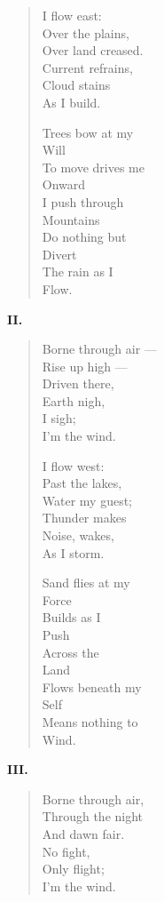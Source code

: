 \begin{paracol}{2}
\begin{leftcolumn}
\begin{verse}
  I flow east:\\
\vin   Over the plains,\\
  Over land creased.\\
\vin   Current refrains,\\
\vin   Cloud stains\\
  As I build.

  Trees bow at my\\
\vin \vin Will\\
  To move drives me\\
\vin \vin Onward\\
  I push through\\
\vin \vin Mountains\\
  Do nothing but\\
\vin \vin Divert\\
  The rain as I\\
\vin \vin Flow.\\
\end{verse}
\newpage

\textbf{II.}
\begin{verse}
  Borne through air ---\\
  \vin Rise up high ---\\
  Driven there,\\
  \vin Earth nigh,\\
  \vin I sigh;\\
  I'm the wind.

  I flow west:\\
  \vin Past the lakes,\\
  Water my guest;\\
  \vin Thunder makes\\
  \vin Noise, wakes,\\
  As I storm.

  Sand flies at my\\
  \vin \vin Force\\
  Builds as I\\
  \vin \vin Push\\
  Across the\\
  \vin \vin Land\\
  Flows beneath my\\
  \vin \vin Self\\
  Means nothing to\\
  \vin \vin Wind.
\end{verse}
\newpage

\textbf{III.}
\begin{verse}
  Borne through air,\\
  \vin Through the night\\
  And dawn fair.\\
  \vin No fight,\\
  \vin Only flight;\\
  I'm the wind.


\end{verse}
\end{leftcolumn}
\end{paracol}
